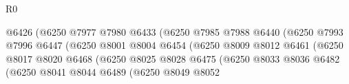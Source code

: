 \begin{lexlean}{R0}
\begin{coremodule}
                                                  @6426
                                                  (@6250
                                                    @7977
                                                    @7980
                                                    @6433
                                                    (@6250
                                                      @7985
                                                      @7988
                                                      @6440
                                                      (@6250
                                                        @7993
                                                        @7996
                                                        @6447
                                                        (@6250
                                                          @8001
                                                          @8004
                                                          @6454
                                                          (@6250
                                                            @8009
                                                            @8012
                                                            @6461
                                                            (@6250
                                                              @8017
                                                              @8020
                                                              @6468
                                                              (@6250
                                                                @8025
                                                                @8028
                                                                @6475
                                                                (@6250
                                                                  @8033
                                                                  @8036
                                                                  @6482
                                                                  (@6250
                                                                    @8041
                                                                    @8044
                                                                    @6489
                                                                    (@6250
                                                                      @8049
                                                                      @8052

\end{coremodule}
\end{lexlean}
